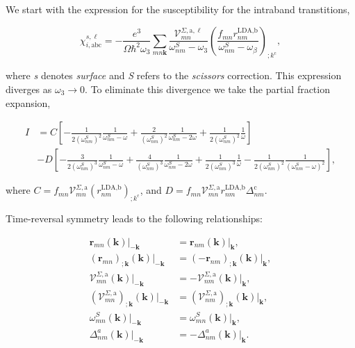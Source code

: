 \documentclass[10pt]{article}
\begin{document}
We start with the expression for the susceptibility for the intraband transtitions,

\begin{equation}\label{chii}
\chi_{i,\text{a}\text{b}\text{c}}^{s,\ell}=-\frac{e^3}{\Omega\hbar^2\omega_3}\sum_{mn\mathbf{k}}\frac{\mathcal{V}_{mn}^{\Sigma,\text{a},\ell}}{\omega^S_{nm}-\omega_3}\left(\frac{f_{mn}r^{\text{LDA,b}}_{nm}}{\omega^S_{nm}-\omega_\beta}\right)_{;k^{\text{c}}},
\end{equation} 

where \emph{s} denotes \emph{surface} and \emph{S} refers to the \emph{scissors} correction. This expression diverges as $\omega_{3} \rightarrow 0$. To eliminate this divergence we take the partial fraction expansion,

\begin{align}\label{pfi} 
I &= C \left[-\frac{1}{2(\omega^{S}_{nm})^{2}}\frac{1}{\omega^{S}_{nm}-\omega}+\frac{2}{(\omega^{S}_{nm})^{2}}\frac{1}{\omega^{S}_{nm}-2\omega}+\frac{1}{2(\omega^{S}_{nm})^{2}}\frac{1}{\omega}\right]\nonumber\\
&- D \left[-\frac{3}{2(\omega^{S}_{nm})^{3}}\frac{1}{\omega^{S}_{nm}-\omega}+\frac{4}{(\omega^{S}_{nm})^{3}}\frac{1}{\omega^{S}_{nm}-2\omega}+\frac{1}{2(\omega^{S}_{nm})^{3}}\frac{1}{\omega}-\frac{1}{2(\omega^{S}_{nm})^{2}}\frac{1}{(\omega^{S}_{nm}-\omega)^2}\right],
\end{align} 

where $C = f_{mn}\mathcal{V}^{\Sigma,\text{a}}_{mn}(r^{\text{LDA,b}}_{nm})_{;k^{\text{c}}}$, and $D=f_{mn}\mathcal{V}^{\Sigma,\text{a}}_{mn}r^{\text{LDA,b}}_{nm}\Delta^{\text{c}}_{nm}$.

Time-reversal symmetry leads to the following relationships:

\begin{align}\label{time_reversal}
\mathbf{r}_{mn}(\mathbf{k})|_{-\mathbf{k}}                                          &=  \mathbf{r}_{nm}(\mathbf{k})|_{\mathbf{k}},                                      \nonumber\\
(\mathbf{r}_{mn})_{;\mathbf{k}}(\mathbf{k})|_{-\mathbf{k}}                          &=  (-\mathbf{r}_{nm})_{;\mathbf{k}}(\mathbf{k})|_{\mathbf{k}},                     \nonumber\\
\mathcal{V}^{\Sigma,\text{a}}_{mn}(\mathbf{k})|_{-\mathbf{k}}                       &=  -\mathbf{\mathcal{V}}_{nm}^{\Sigma,\text{a}}(\mathbf{k})|_{\mathbf{k}},         \nonumber\\
(\mathcal{V}^{\Sigma,\text{a}}_{mn})_{;\mathbf{k}}(\mathbf{k})|_{-\mathbf{k}}       &=  (\mathbf{\mathcal{V}}_{nm}^{\Sigma,\text{a}})_{;\mathbf{k}}(\mathbf{k})|_{\mathbf{k}},   \\
\omega_{mn}^{S}(\mathbf{k})|_{-\mathbf{k}}                                          &=  \omega_{mn}^{S}(\mathbf{k})|_{\mathbf{k}},                                      \nonumber\\
\Delta^a_{nm}(\mathbf{k})|_{-\mathbf{k}}                                            &=  -\Delta^a_{nm}(\mathbf{k})|_{\mathbf{k}}.                                       \nonumber
\end{align}
\end{document}
